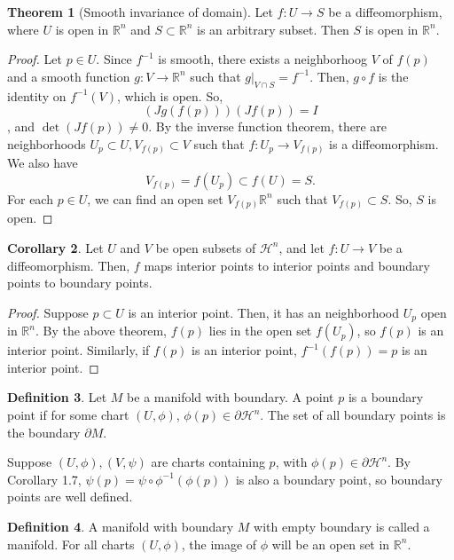 \documentclass[]{article}
\DeclareMathOperator{\Det}{det}
\theoremstyle{definition}
\newtheorem{theorem}{Theorem}[section] %
\theoremstyle{definition}
\newtheorem{definition}[theorem]{Definition} %
\newtheorem{corollary}[theorem]{Corollary}
\begin{document}
\begin{theorem}[Smooth invariance of domain]
    Let $f:U\rightarrow S$ be a diffeomorphism, where $U$ is open in $\mathbb{R}^n$ and $S\subset \mathbb{R}^n$ is an arbitrary subset. Then $S$ is open in $\mathbb{R}^n$.
\end{theorem}
\begin{proof}
    Let $p\in U$. Since $f^{-1}$ is smooth, there exists a neighborhoog $V$ of $f(p)$ and a smooth function $g:V \rightarrow \mathbb{R}^n$ such that $g|_{V\cap S}=f^{-1}$. Then, $g\circ f$ is the identity on $f^{-1}(V)$, which is open. So, \[(Jg(f(p)))(Jf(p))=I\], and $\Det(Jf(p))\neq 0$. By the inverse function theorem, there are neighborhoods $U_p\subset U, V_{f(p)}\subset V$ such that $f:U_p \rightarrow V_{f(p)}$ is a diffeomorphism. We also have \[V_{f(p)}=f(U_p)\subset f(U)=S.\] For each $p\in U$, we can find an open set $V_{f(p)}\mathbb{R}^n$ such that $V_{f(p)}\subset S$. So, $S$ is open.
\end{proof}

\begin{corollary}
    Let $U$ and $V$ be open subsets of $\mathcal{H}^n$, and let $f:U \rightarrow V$ be a diffeomorphism. Then, $f$ maps interior points to interior points and boundary points to boundary points.
\end{corollary}
\begin{proof} 
    Suppose $p\subset U$ is an interior point. Then, it has an neighborhood $U_p$ open in $\mathbb{R}^n$. By the above theorem, $f(p)$ lies in the open set $f(U_p)$, so $f(p)$ is an interior point. Similarly, if $f(p)$ is an interior point, $f^{-1}(f(p))=p$ is an interior point.
\end{proof}

\begin{definition}
    Let $M$ be a manifold with boundary. A point $p$ is a boundary point if for some chart $(U, \phi)$, $\phi(p)\in \partial \mathcal{H}^n$. The set of all boundary points is the boundary $\partial M$.
\end{definition}

Suppose $(U,\phi),(V,\psi)$ are charts containing $p$, with $\phi(p)\in\partial \mathcal{H}^n $. By Corollary 1.7, $\psi(p)=\psi\circ\phi^{-1}(\phi(p))$ is also a boundary point, so boundary points are well defined.


\begin{definition}
    A manifold with boundary $M$ with empty boundary is called a manifold. For all charts $(U, \phi)$, the image of $\phi$ will be an open set in $\mathbb{R}^n$.
\end{definition}
\end{document}
